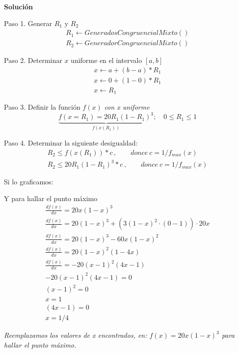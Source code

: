 \documentclass[11pt,letterpaper]{report}
\begin{document}
\textbf{Solución}

Paso 1. Generar $R_1$ y $R_2$
\begin{gather*}
R_1 \leftarrow GeneradosCongruencialMixto()\\
R_2 \leftarrow GeneradorCongruencialMixto()
\end{gather*}

Paso 2. Determinar $x$ uniforme en el intervalo $[a, b]$
\begin{gather*}
x \leftarrow a + (b - a) * R_1\\
x \leftarrow 0 + (1 - 0) * R_1\\
\boxed{x \leftarrow R_1}
\end{gather*}

Paso 3. Definir la función $f(x)$ \textit{con x uniforme}
\[
\underbrace{f(x = R_1) = 20R_1(1 - R_1)^3}_{f(x(R_1))};\quad 0 \leq R_1 \leq 1
\]

Paso 4. Determinar la siguiente desigualdad:
\begin{gather*}
R_2 \leq f(x(R_1)) * c\,,\qquad donce\ c = 1/f_{max}(x)\\
R_2 \leq 20R_1(1 - R_1)^3 * c\,,\qquad donce\ c = 1/f_{max}(x)
\end{gather*}

Si lo graficamos:

\begin{center}
\end{center}

Y para hallar el punto máximo
\begin{gather*}
\frac{df(x)}{dx} = 20x(1-x)^3\\
\frac{df(x)}{dx} = 20(1-x)^3 + \left(3(1-x)^2 \cdot (0 - 1)\right) \cdot 20x\\
\frac{df(x)}{dx} = 20(1-x)^3 - 60x(1-x)^2\\
\frac{df(x)}{dx} = 20(1-x)^2(1 - 4x)\\
\frac{df(x)}{dx} = -20(x-1)^2(4x - 1)\\
-20(x-1)^2(4x-1) = 0\\
(x-1)^2 = 0\\
x = 1\\
(4x - 1) = 0\\
\boxed{x = 1/4}
\end{gather*}

\textit{Reemplazamos los valores de x encontrados, en: $f(x) = 20x(1-x)^3$ para hallar el punto máximo.}
\end{document}
